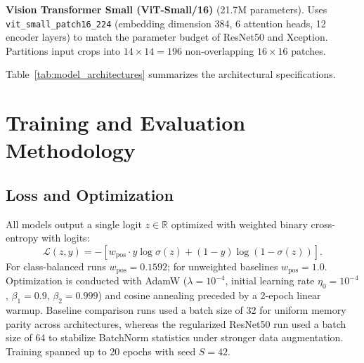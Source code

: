 \documentclass[conference]{IEEEtran}
\begin{document}
\textbf{Vision Transformer Small (ViT-Small/16)} \cite{dosovitskiy2020vit} (21.7M parameters). Uses \texttt{vit\_small\_patch16\_224} (embedding dimension 384, 6 attention heads, 12 encoder layers) to match the parameter budget of ResNet50 and Xception. Partitions input crops into $14 \times 14 = 196$ non-overlapping $16 \times 16$ patches.

Table~\ref{tab:model_architectures} summarizes the architectural specifications.

\begin{table}[!t]
\caption{Architecture Specifications and Checkpoint Footprints.}
\label{tab:model_architectures}
\centering
{}
\end{table}


\section{Training and Evaluation Methodology}
\label{sec:training}

\subsection{Loss and Optimization}
All models output a single logit $z \in \mathbb{R}$ optimized with weighted binary cross-entropy with logits:
\begin{equation}
\mathcal{L}(z, y) = -\left[ w_{\text{pos}} \cdot y \log \sigma(z) + (1-y) \log(1-\sigma(z)) \right].
\end{equation}
For class-balanced runs $w_{\text{pos}} = 0.1592$; for unweighted baselines $w_{\text{pos}} = 1.0$. Optimization is conducted with AdamW ($\lambda = 10^{-4}$, initial learning rate $\eta_0 = 10^{-4}$, $\beta_1=0.9$, $\beta_2=0.999$) and cosine annealing preceded by a 2-epoch linear warmup. Baseline comparison runs used a batch size of 32 for uniform memory parity across architectures, whereas the regularized ResNet50 run used a batch size of 64 to stabilize BatchNorm statistics under stronger data augmentation. Training spanned up to 20 epochs with seed $S=42$.
\end{document}
